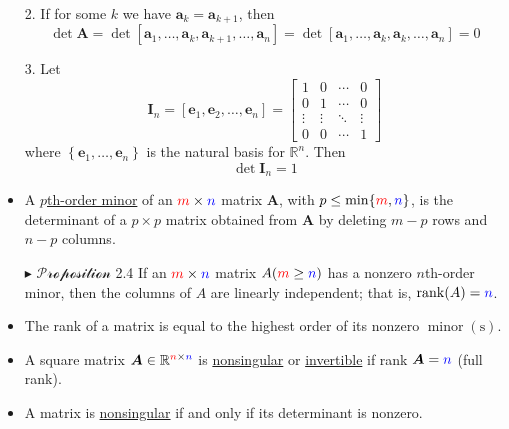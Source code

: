 \documentclass[12pt,thmsa]{article}
\begin{document}
\begin{itemize}
	2. If for some \(k\) we have \(\boldsymbol{a}_{k}=\boldsymbol{a}_{k+1}\), then
	\[\operatorname{det} \boldsymbol{A}=\operatorname{det}\left[\boldsymbol{a}_{1}, \ldots, \boldsymbol{a}_{k}, \boldsymbol{a}_{k+1}, \ldots, \boldsymbol{a}_{n}\right]=\operatorname{det}\left[\boldsymbol{a}_{1}, \ldots, \boldsymbol{a}_{k}, \boldsymbol{a}_{k}, \ldots, \boldsymbol{a}_{n}\right]=0\]
	
	3. Let
	\[
	\boldsymbol{I}_{n}=\left[\boldsymbol{e}_{1}, \boldsymbol{e}_{2}, \ldots, \boldsymbol{e}_{n}\right]=\left[\begin{array}{cccc}
		1 & 0 & \cdots & 0 \\
		0 & 1 & \cdots & 0 \\
		\vdots & \vdots & \ddots & \vdots \\
		0 & 0 & \cdots & 1
	\end{array}\right]
	\]
	where \( \left\{\boldsymbol{e}_{1}, \ldots, \boldsymbol{e}_{n}\right\} \) is the natural basis for \(\mathbb{R}^{n}\). Then
	\[
	\operatorname{det} \boldsymbol{I}_{n}=1
	\]
	
	\item A \underline{\(p\)th-order minor} of an \({\color{red}{m}} \times {\color{blue}{n}}\) matrix \(\boldsymbol{A}\), with \(p \leq \min \{{\color{red}{m}}, {\color{blue}{n}}\}\), is the determinant of a \(p \times p\) matrix obtained from \(\boldsymbol{A}\) by deleting \(m-p\) rows and \(n-p\) columns.
	
	\item[\(\blacktriangleright\)] \(\mathcal{Proposition}\) 2.4 If an \({\color{red}{m}} \times {\color{blue}{n}}\) matrix \(A({\color{red}{m}} \geq {\color{blue}{n}})\) has a nonzero \(n\)th-order minor, then the columns of \(A\) are linearly independent; that is, \(\operatorname{rank}(A)={\color{blue}{n}}\).
	
	\item The rank of a matrix is equal to the highest order of its nonzero \(\operatorname{minor}(\mathrm{s})\).
	
	\item A square matrix \(\boldsymbol{A} \in \mathbb{R}^{{\color{red}{n}} \times {\color{blue}{n}}}\) is \underline{nonsingular} or \underline{invertible} if rank \(\boldsymbol{A}={\color{blue}{n}}\) (full rank).
	
	\item A matrix is \underline{nonsingular} if and only if its determinant is nonzero.
	
\end{itemize}
\end{document}
